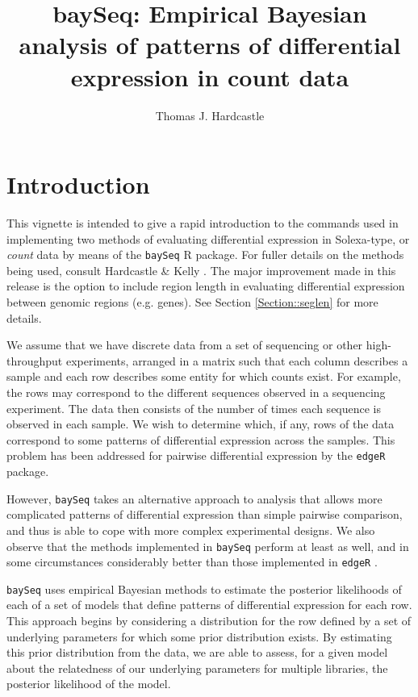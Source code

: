 \documentclass[a4paper]{article}
\title{baySeq: Empirical Bayesian analysis of patterns of differential expression in count data}
\author{Thomas J. Hardcastle}
\begin{document}
\maketitle

\section{Introduction}

This vignette is intended to give a rapid introduction to the commands used in implementing two methods of evaluating differential expression in Solexa-type, or \textsl{count} data by means of the \verb'baySeq' \textsf{R} package. For fuller details on the methods being used, consult Hardcastle \& Kelly \cite{hardcastle}. The major improvement made in this release is the option to include region length in evaluating differential expression between genomic regions (e.g. genes). See Section \ref{Section::seglen} for more details.

We assume that we have discrete data from a set of sequencing or other high-throughput experiments, arranged in a matrix such that each column describes a sample and each row describes some entity for which counts exist. For example, the rows may correspond to the different sequences observed in a sequencing experiment. The data then consists of the number of times each sequence is observed in each sample. We wish to determine which, if any, rows of the data correspond to some patterns of differential expression across the samples. This problem has been addressed for pairwise differential expression by the \verb'edgeR' \cite{edgeR} package. 

However, \verb'baySeq' takes an alternative approach to analysis that allows more complicated patterns of differential expression than simple pairwise comparison, and thus is able to cope with more complex experimental designs. We also observe that the methods implemented in \verb'baySeq' perform at least as well, and in some circumstances considerably better than those implemented in \verb'edgeR' \cite{hardcastle}.

\verb'baySeq' uses empirical Bayesian methods to estimate the posterior likelihoods of each of a set of models that define patterns of differential expression for each row. This approach begins by considering a distribution for the row defined by a set of underlying parameters for which some prior distribution exists. By estimating this prior distribution from the data, we are able to assess, for a given model about the relatedness of our underlying parameters for multiple libraries, the posterior likelihood of the model.
\end{document}
